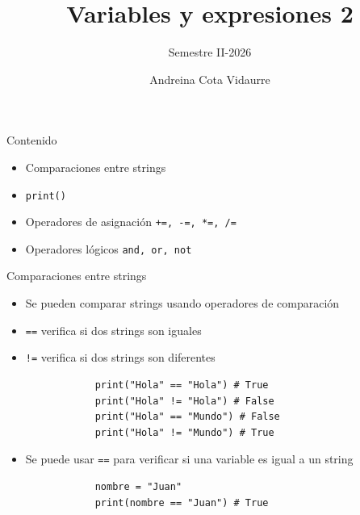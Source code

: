 \documentclass{beamer}
\title{Variables y expresiones 2} %
\subtitle{Semestre II-2026} %
\author{Andreina Cota Vidaurre}
\begin{document}
  \shorthandoff{-}
  \frame[c]{\maketitle}


    \begin{frame}{Contenido}
        \begin{itemize}
            \item Comparaciones entre strings
            \item \texttt{print()}
            \item Operadores de asignación \texttt{+=, -=, *=, /=}
            \item Operadores lógicos \texttt{and, or, not}
        \end{itemize}
    \end{frame}

    \begin{frame}[fragile,t]{Comparaciones entre strings}
        \begin{itemize}
            \item Se pueden comparar strings usando operadores de comparación
            \item \texttt{==} verifica si dos strings son iguales
            \item \texttt{!=} verifica si dos strings son diferentes
            \begin{verbatim}
            print("Hola" == "Hola") # True
            print("Hola" != "Hola") # False
            print("Hola" == "Mundo") # False
            print("Hola" != "Mundo") # True
            \end{verbatim}
            \item Se puede usar \texttt{==} para verificar si una variable es igual a un string
            \begin{verbatim}
            nombre = "Juan"
            print(nombre == "Juan") # True
            \end{verbatim}
        \end{itemize}
    \end{frame}
\end{document}
